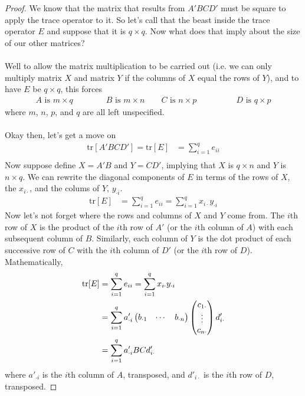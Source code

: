 \documentclass[12pt]{article}
\theoremstyle{plain}
\theoremstyle{definition}
\theoremstyle{remark}
\begin{document}
\begin{proof} We know that the matrix that results from
$A'BCD'$ must be square to
apply the trace operator to it.  So let's call that the beast
inside the trace operator $E$ and suppose that it is
$q \times q$. Now what does that imply about the size of our
other matrices?
\\
\\
Well to allow the matrix multiplication to
be carried out (i.e. we can only multiply matrix $X$ and
matrix $Y$ if the columns of $X$ equal the rows of $Y$),
and to have $E$ be $q\times q$, this forces
\begin{align*}
    A \text{ is } m \times q \qquad
	 \qquad B \text{ is } m \times n \qquad
    C \text{ is } n \times p \qquad
	& \qquad
    D \text{ is } q \times p
\end{align*}
where $m$, $n$, $p$, and $q$ are all left unspecified.
\\
\\
Okay then, let's get a move on
\begin{align*}
    \text{tr}[A'BCD'] = \text{tr}[E] &=
	\sum^q_{i=1} e_{ii} \\
\end{align*}
Now suppose define $X = A'B$ and $Y = CD'$, implying
that $X$ is $q\times n$ and $Y$ is $n\times q$.
We can rewrite the diagonal components of $E$ in
terms of the rows of $X$, the $x_{i\cdot}$, and
the colums of $Y$, $y_{\cdot i}$.
\begin{align*}
    \text{tr}[E] &=
	\sum^q_{i=1} e_{ii}
	= \sum^q_{i=1} x_{i\cdot} y_{\cdot i}
\end{align*}
Now let's not forget where the rows and columns of
$X$ and $Y$ come from. The $i$th row of $X$ is
the product of the $i$th row of $A'$ (or the $i$th
column of $A$) with
each subsequent column of $B$. Similarly, each
column of $Y$ is the dot product of each
successive row of $C$ with the $i$th column of $D'$
(or the $i$th row of $D$).
Mathematically,
\begin{align}
    \text{tr}[E] &=
	\sum^q_{i=1} e_{ii}
	= \sum^q_{i=1} x_{i\cdot} y_{\cdot i} \notag \\
    &= \sum^q_{i=1} a'_{\cdot i}
	\begin{pmatrix} b_{\cdot 1} & \cdots & b_{\cdot n}
	\end{pmatrix}
	\begin{pmatrix} c_{1\cdot} \\ \vdots \\ c_{n \cdot}
	\end{pmatrix}
	d'_{i \cdot} \label{fullrep} \\
    &= \sum^q_{i=1} a'_{\cdot i}
	BC
	d'_{i \cdot} \label{simprep}
\end{align}
where $a'_{\cdot i}$ is the $i$th column of $A$,
transposed, and $d'_{i \cdot}$ is the $i$th row of $D$,
transposed.


\end{proof}
\end{document}
